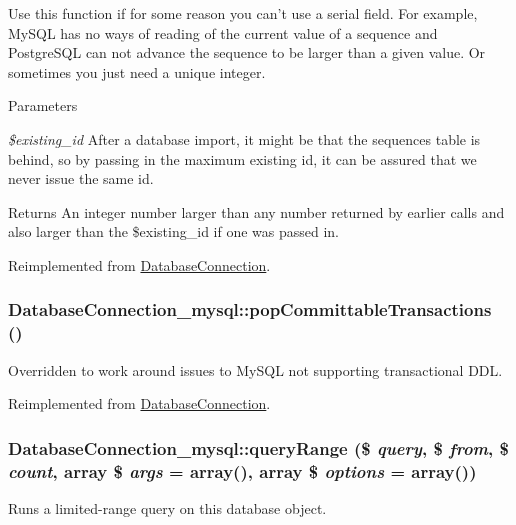 Use this function if for some reason you can't use a serial field. For example, MySQL has no ways of reading of the current value of a sequence and PostgreSQL can not advance the sequence to be larger than a given value. Or sometimes you just need a unique integer.


\begin{DoxyParams}{Parameters}
\item[{\em \$existing\_\-id}]After a database import, it might be that the sequences table is behind, so by passing in the maximum existing id, it can be assured that we never issue the same id.\end{DoxyParams}
\begin{DoxyReturn}{Returns}
An integer number larger than any number returned by earlier calls and also larger than the \$existing\_\-id if one was passed in. 
\end{DoxyReturn}


Reimplemented from \hyperlink{classDatabaseConnection_a173e333ef1b61541cf37125468a37231}{DatabaseConnection}.\hypertarget{classDatabaseConnection__mysql_ad63915bedc73d668f05295b8572a33c0}{
\subsubsection[{popCommittableTransactions}]{\setlength{\rightskip}{0pt plus 5cm}DatabaseConnection\_\-mysql::popCommittableTransactions ()}}
\label{classDatabaseConnection__mysql_ad63915bedc73d668f05295b8572a33c0}
Overridden to work around issues to MySQL not supporting transactional DDL. 

Reimplemented from \hyperlink{classDatabaseConnection_ade8d68cea197dc7703042ab505ed940d}{DatabaseConnection}.\hypertarget{classDatabaseConnection__mysql_a8fa3e83f5a5e85e85d2b06247a8d8a24}{
\subsubsection[{queryRange}]{\setlength{\rightskip}{0pt plus 5cm}DatabaseConnection\_\-mysql::queryRange (\$ {\em query}, \/  \$ {\em from}, \/  \$ {\em count}, \/  array \$ {\em args} = {\ttfamily array()}, \/  array \$ {\em options} = {\ttfamily array()})}}
\label{classDatabaseConnection__mysql_a8fa3e83f5a5e85e85d2b06247a8d8a24}
Runs a limited-\/range query on this database object.

